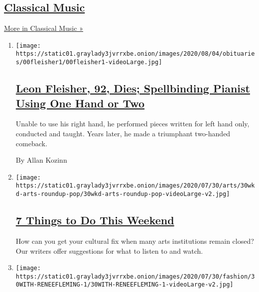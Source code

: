 \hypertarget{classical-music}{%
\subsection{\texorpdfstring{\href{/spotlight/classical-music-reviews}{Classical
Music}}{Classical Music}}\label{classical-music}}

\href{/spotlight/classical-music-reviews}{More in Classical Music »}

\begin{enumerate}
\def\labelenumi{\arabic{enumi}.}
\item
  \texttt{[image: https://static01.graylady3jvrrxbe.onion/images/2020/08/04/obituaries/00fleisher1/00fleisher1-videoLarge.jpg]}

  \hypertarget{leon-fleisher-92-dies-spellbinding-pianist-using-one-hand-or-two}{%
  \subsection{\texorpdfstring{\href{/2020/08/02/arts/music/leon-fleisher-dead.html}{Leon
  Fleisher, 92, Dies; Spellbinding Pianist Using One Hand or
  Two}}{Leon Fleisher, 92, Dies; Spellbinding Pianist Using One Hand or Two}}\label{leon-fleisher-92-dies-spellbinding-pianist-using-one-hand-or-two}}

  Unable to use his right hand, he performed pieces written for left
  hand only, conducted and taught. Years later, he made a triumphant
  two-handed comeback.

  By Allan Kozinn
\item
  \texttt{[image: https://static01.graylady3jvrrxbe.onion/images/2020/07/30/arts/30wkd-arts-roundup-pop/30wkd-arts-roundup-pop-videoLarge-v2.jpg]}

  \hypertarget{7-things-to-do-this-weekend}{%
  \subsection{\texorpdfstring{\href{/2020/07/30/arts/things-to-do-weekend-coronavirus.html}{7
  Things to Do This
  Weekend}}{7 Things to Do This Weekend}}\label{7-things-to-do-this-weekend}}

  How can you get your cultural fix when many arts institutions remain
  closed? Our writers offer suggestions for what to listen to and watch.
\item
  \texttt{[image: https://static01.graylady3jvrrxbe.onion/images/2020/07/30/fashion/30WITH-RENEEFLEMING-1/30WITH-RENEEFLEMING-1-videoLarge-v2.jpg]}


\end{enumerate}
